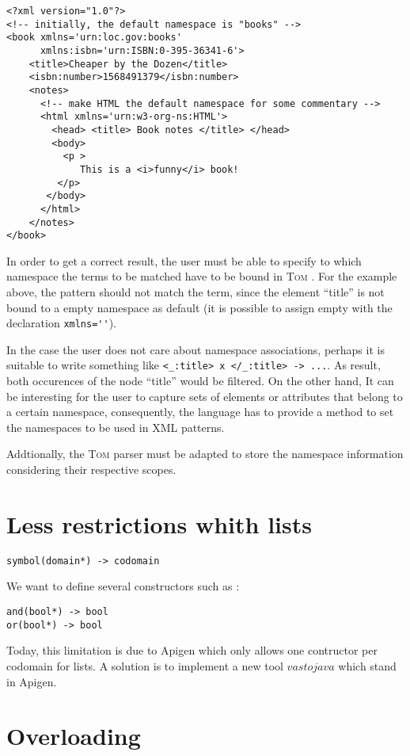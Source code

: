 \documentclass{article}
\newcommand{\tom}{\textsc{Tom} }
\begin{document}
\begin{verbatim}
<?xml version="1.0"?>
<!-- initially, the default namespace is "books" -->
<book xmlns='urn:loc.gov:books'
      xmlns:isbn='urn:ISBN:0-395-36341-6'>
    <title>Cheaper by the Dozen</title>
    <isbn:number>1568491379</isbn:number>
    <notes>
      <!-- make HTML the default namespace for some commentary -->
      <html xmlns='urn:w3-org-ns:HTML'>
        <head> <title> Book notes </title> </head>
        <body>
          <p >
             This is a <i>funny</i> book!
         </p>
       </body>
      </html> 
    </notes>
</book>
\end{verbatim}

In order to get a correct result, the user must be able to specify to which namespace the terms to be matched have to be bound in \tom. For the example above, the pattern should not match the term, since the element ``title'' is not bound to a empty namespace as default (it is possible to assign empty with the declaration \verb$xmlns=''$). 

In the case the user does not care about namespace associations, perhaps it is suitable to write something like \verb$<_:title> x </_:title> -> ...$. As result, both occurences of the node ``title'' would be filtered. On the other hand, It can be interesting for the user to capture sets of elements or attributes that belong to a certain namespace, consequently, the language has to provide a method to set the namespaces to be used in XML patterns. 

Addtionally, the \tom parser must be adapted to store the namespace information considering their respective scopes.

\section{Less restrictions whith lists}
\begin{verbatim}
symbol(domain*) -> codomain
\end{verbatim}
We want to define several constructors such as :
\begin{verbatim}
and(bool*) -> bool
or(bool*) -> bool
\end{verbatim}
Today, this limitation is due to Apigen which only allows one contructor per codomain for lists.
A solution is to implement a new tool $vastojava$ which stand in Apigen.

\section{Overloading}
\end{document}
